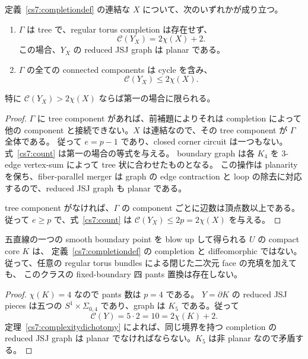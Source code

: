 \begin{theorem}
\label{cs7:complexitydichotomy}
定義~\ref{cs7:completiondef} の連結な $X$ について、次のいずれかが成り立つ。
\begin{enumerate}
 \item $\Gamma$ は tree で、regular torus completion は存在せず、
 \[
  \mathcal C(Y_X)=2\chi(X)+2.
 \]
 この場合、$Y_X$ の reduced JSJ graph は planar である。
 \item $\Gamma$ の全ての connected components は cycle を含み、
 \[
  \mathcal C(Y_X)\leq2\chi(X).
 \]
\end{enumerate}
特に $\mathcal C(Y_X)>2\chi(X)$ ならば第一の場合に限られる。
\end{theorem}

\begin{proof}
$\Gamma$ に tree component があれば、前補題によりそれは completion によって
他の component と接続できない。$X$ は連結なので、その tree component が $\Gamma$ 全体である。
従って $e=p-1$ であり、closed corner circuit は一つもない。
式~\eqref{cs7:count} は第一の場合の等式を与える。
boundary graph は各 $K_4$ を 3-edge vertex-sum によって tree 状に合わせたものとなる。
この操作は planarity を保ち、fiber-parallel merger は graph の edge contraction と
loop の除去に対応するので、reduced JSJ graph も planar である。

tree component がなければ、$\Gamma$ の component ごとに辺数は頂点数以上である。
従って $e\geq p$ で、式~\eqref{cs7:count} は
$\mathcal C(Y_X)\leq2p=2\chi(X)$ を与える。
\end{proof}

\begin{corollary}
\label{cs7:fourpantsnogo}
五直線の一つの smooth boundary point を blow up して得られる $U$ の compact core $K$ は、
定義~\ref{cs7:completiondef} の completion と diffeomorphic ではない。
従って、任意の regular torus bundles による閉じた二次元 face の充填を加えても、
このクラスの fixed-boundary 四 pants 置換は存在しない。
\end{corollary}

\begin{proof}
$\chi(K)=4$ なので pants 数は $p=4$ である。
$Y=\partial K$ の reduced JSJ pieces は五つの
$S^1\times\Sigma_{0,4}$ であり、graph は $K_5$ である。従って
\[
 \mathcal C(Y)=5\cdot2=10=2\chi(K)+2.
\]
定理~\ref{cs7:complexitydichotomy} によれば、同じ境界を持つ completion の
reduced JSJ graph は planar でなければならない。$K_5$ は非 planar なので矛盾する。
\end{proof}

